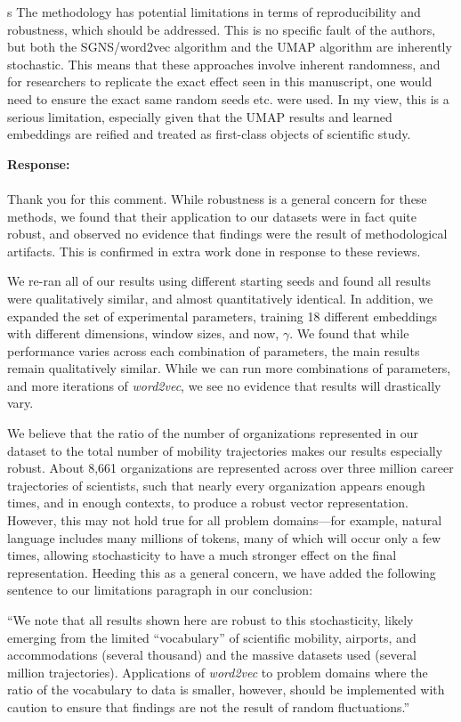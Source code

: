 \documentclass[12pt,a4paper]{article}
\newcounter{comment}[subsection]
\newcommand{\response}[1]{{\noindent \textbf{Response:} \\ \\ \noindent #1}}
\newcommand{\rcomment}[1]{%
\vspace{10pt}
\begin{sectionbox}
s #1
\end{sectionbox}
}
\begin{document}
\rcomment{%
	The methodology has potential limitations in terms of reproducibility and robustness, which should be addressed. This is no specific fault of the authors, but both the SGNS/word2vec algorithm and the UMAP algorithm are inherently stochastic. This means that these approaches involve inherent randomness, and for researchers to replicate the exact effect seen in this manuscript, one would need to ensure the exact same random seeds etc. were used. In my view, this is a serious limitation, especially given that the UMAP results and learned embeddings are reified and treated as first-class objects of scientific study.
}

\response{Thank you for this comment. While robustness is a general concern for these methods, we found that their application to our datasets were in fact quite robust, and observed no evidence that findings were the result of methodological artifacts. This is confirmed in extra work done in response to these reviews.

	We re-ran all of our results using different starting seeds and found all results were qualitatively similar, and almost quantitatively identical.
	In addition, we expanded the set of experimental parameters, training 18 different embeddings with different dimensions, window sizes, and now, $\gamma$.
	We found that while performance varies across each combination of parameters, the main results remain qualitatively similar.
	While we can run more combinations of parameters, and more iterations of \textit{word2vec}, we see no evidence that results will drastically vary.

	We believe that the ratio of the number of organizations represented in our dataset to the total number of mobility trajectories makes our results especially robust.
	About 8,661 organizations are represented across over three million career trajectories of scientists, such that nearly every organization appears enough times, and in enough contexts, to produce a robust vector representation.
	However, this may not hold true for all problem domains—for example, natural language includes many millions of tokens, many of which will occur only a few times, allowing stochasticity to have a much stronger effect on the final representation.
	Heeding this as a general concern, we have added the following sentence to our limitations paragraph in our conclusion:

	“We note that all results shown here are robust to this stochasticity, likely emerging from the limited ``vocabulary'' of scientific mobility, airports, and accommodations (several thousand) and the massive datasets used (several million trajectories). Applications of \textit{word2vec} to problem domains where the ratio of the vocabulary to data is smaller, however, should be implemented with caution to ensure that findings are not the result of random fluctuations.”

}
\end{document}

